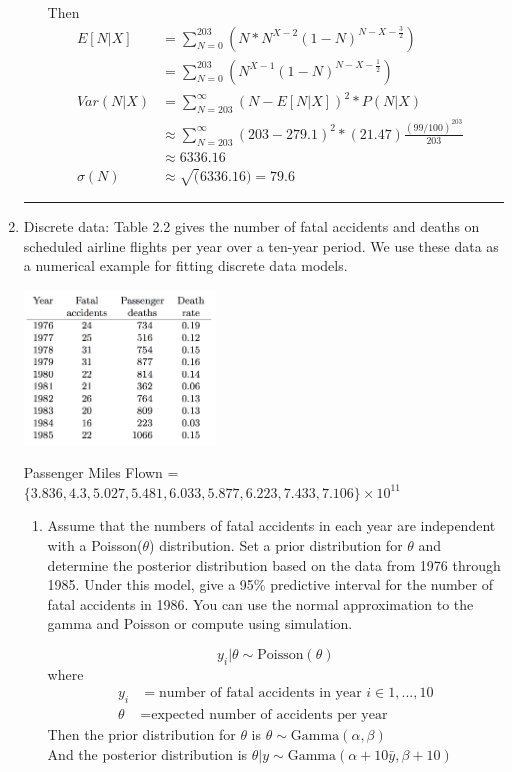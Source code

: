 \documentclass[11pt]{article}
\theoremstyle{definition}
\theoremstyle{remark}
\theoremstyle{definition}
\begin{document}
\begin{enumerate}
\begin{enumerate}
					Then 
		\begin{align*}
			E[N|X] &= \sum_{N=0}^{203} (N *  N^{X-2}(1-N)^{N-X-\frac{3}{2}}) \\
			&= \sum_{N=0}^{203} (N^{X-1}(1-N)^{N-X-\frac{1}{2}})
			& \\
			Var(N|X) 
			&= \sum_{N=203}^\infty (N-E[N|X])^2 * P(N|X) \\
			&\approx \sum_{N=203}^\infty (203-279.1)^2 * (21.47) \frac{(99/100)^{203}}{203}\\
			&\approx 6336.16\\
			\sigma(N) &\approx \sqrt(6336.16) = 79.6
		\end{align*}
		
	\end{enumerate}
	
\rule{0.94\textwidth}{0.4pt}

	\item Discrete data: Table 2.2 gives the number of fatal accidents and deaths on scheduled airline flights per year over a ten-year period. We use these data as a numerical example for fitting discrete data models.

	\includegraphics[width = 0.4\textwidth]{Table_22}
	
	Passenger Miles Flown = $\{3.836,4.3,5.027,5.481,6.033,5.877,6.223,7.433,7.106\} \times 10^{11}$
	
\begin{enumerate}
	\item Assume that the numbers of fatal accidents in each year are independent with a Poisson($\theta$) distribution. Set a prior distribution for $\theta$ and determine the posterior 	distribution based on the data from 1976 through 1985. Under this model, give a 95\% predictive interval for the number of fatal accidents in 1986. You can use the normal approximation to the gamma and Poisson or compute using simulation.
	
			$$y_i|\theta \sim \text{Poisson}(\theta)$$
		where \begin{align*}
			y_i &= \text{number of fatal accidents in year } i \in {1,...,10} \\
			\theta &= \text{expected number of accidents per year}
		\end{align*} 
	Then the prior distribution for $\theta$ is $\theta \sim \text{Gamma}(\alpha, \beta) $\\
	And the posterior distribution is $\theta|y \sim \text{Gamma}(\alpha + 10\bar{y}, \beta + 10) $
	

\end{enumerate}
\end{enumerate}
\end{document}
